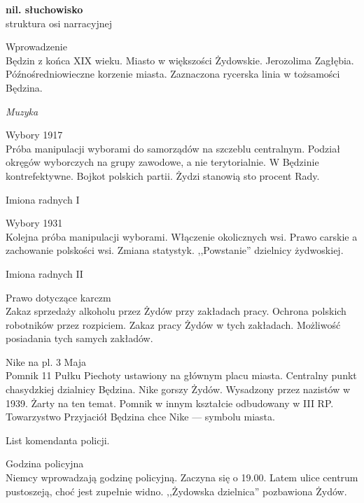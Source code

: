 \documentclass[10pt,a4paper,oneside]{article}
\begin{document}
\noindent
\textbf{nil. słuchowisko}\\
struktura osi narracyjnej


{\large Wprowadzenie}\\
Będzin z końca XIX wieku. Miasto w większości Żydowskie.
Jerozolima Zagłębia.  Późnośredniowieczne korzenie miasta.
Zaznaczona rycerska linia w tożsamości Będzina. 


{\color{sound}
{\large \emph{Muzyka}}
}


{\large Wybory 1917}\\
Próba manipulacji wyborami do samorządów na szczeblu
centralnym. Podział okręgów wyborczych na grupy zawodowe,
a nie terytorialnie. W Będzinie kontrefektywne.  Bojkot
polskich partii. Żydzi stanowią sto procent Rady.


{\large\color{loss} Imiona radnych I}


{\large Wybory 1931}\\
Kolejna próba manipulacji wyborami. Włączenie okolicznych
wsi. Prawo carskie a zachowanie polskości wsi. Zmiana
statystyk. ,,Powstanie'' dzielnicy żydwoskiej.

{\large\color{loss} Imiona radnych II}

{\color{extras}
{\large Prawo dotyczące karczm}\\
Zakaz sprzedaży alkoholu przez Żydów przy zakładach pracy.
Ochrona polskich robotników przez rozpiciem. Zakaz pracy
Żydów w tych zakładach. Możliwość posiadania tych samych
zakładów. 
}

{\color{extras}
{\large Nike na pl. 3 Maja}\\
Pomnik 11 Pułku Piechoty ustawiony na głównym placu miasta.
Centralny punkt chasydzkiej dzialnicy Będzina.  Nike gorszy
Żydów. Wysadzony przez nazistów w 1939.  Żarty na ten temat.
Pomnik w innym kształcie odbudowany w III RP. Towarzystwo
Przyjaciół Będzina chce Nike --- symbolu miasta.
}

{\large\color{loss} List komendanta policji.}

{\large Godzina policyjna}\\
Niemcy wprowadzają godzinę policyjną. Zaczyna się o 19.00.
Latem ulice centrum pustoszeją, choć jest zupełnie widno.
,,Żydowska dzielnica'' pozbawiona Żydów. 
\end{document}
